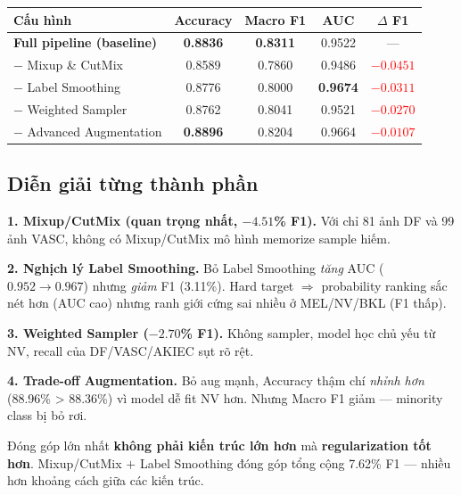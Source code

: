 \documentclass[11pt,a4paper]{article}
\begin{document}
\begin{table}[h]
\centering\small
\begin{tabular}{lcccc}
\toprule
\textbf{Cấu hình} & \textbf{Accuracy} & \textbf{Macro F1} & \textbf{AUC} & \textbf{$\Delta$ F1} \\
\midrule
\textbf{Full pipeline (baseline)} & \textbf{0.8836} & \textbf{0.8311} & 0.9522 & --- \\
\midrule
$-$ Mixup \& CutMix          & 0.8589 & 0.7860 & 0.9486 & \textcolor{red}{$\mathbf{-0.0451}$} \\
$-$ Label Smoothing          & 0.8776 & 0.8000 & \textbf{0.9674} & \textcolor{red}{$-0.0311$} \\
$-$ Weighted Sampler         & 0.8762 & 0.8041 & 0.9521 & \textcolor{red}{$-0.0270$} \\
$-$ Advanced Augmentation    & \textbf{0.8896} & 0.8204 & 0.9664 & \textcolor{red}{$-0.0107$} \\
\bottomrule
\end{tabular}
\end{table}

\subsection{Diễn giải từng thành phần}

\textbf{1. Mixup/CutMix (quan trọng nhất, $-4.51$\% F1).} Với chỉ 81 ảnh DF và 99 ảnh VASC, không có Mixup/CutMix mô hình memorize sample hiếm.

\textbf{2. Nghịch lý Label Smoothing.} Bỏ Label Smoothing \textit{tăng} AUC ($0.952 \to 0.967$) nhưng \textit{giảm} F1 (3.11\%). Hard target $\Rightarrow$ probability ranking sắc nét hơn (AUC cao) nhưng ranh giới cứng sai nhiều ở MEL/NV/BKL (F1 thấp).

\textbf{3. Weighted Sampler ($-2.70$\% F1).} Không sampler, model học chủ yếu từ NV, recall của DF/VASC/AKIEC sụt rõ rệt.

\textbf{4. Trade-off Augmentation.} Bỏ aug mạnh, Accuracy thậm chí \textit{nhỉnh hơn} (88.96\% > 88.36\%) vì model dễ fit NV hơn. Nhưng Macro F1 giảm --- minority class bị bỏ rơi.

\begin{idea}
Đóng góp lớn nhất \textbf{không phải kiến trúc lớn hơn} mà \textbf{regularization tốt hơn}. Mixup/CutMix $+$ Label Smoothing đóng góp tổng cộng 7.62\% F1 --- nhiều hơn khoảng cách giữa các kiến trúc.
\end{idea}
\end{document}

